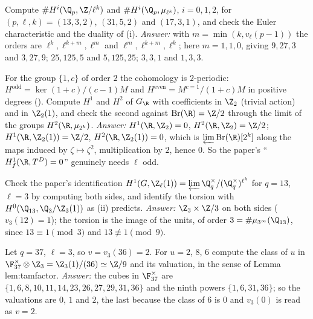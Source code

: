 \begin{exercise}\label{ex:galcoh:ex-orders}
Compute $\#H^i(\Q_p,\Z/\ell^k)$ and $\#H^i(\Q_p,\mu_{\ell^k})$, $i=0,1,2$, for $(p,\ell,k)=(13,3,2)$, $(31,5,2)$ and $(17,3,1)$, and check the Euler characteristic and the duality
of (i). \emph{Answer:} with $m=\min(k,v_\ell(p-1))$ the orders are $\ell^k,\ell^{k+m},\ell^m$ and $\ell^m,\ell^{k+m},\ell^k$; here $m=1,1,0$, giving
$9,27,3$ and $3,27,9$; $25,125,5$ and $5,125,25$; $3,3,1$ and $1,3,3$.
\end{exercise}

\begin{exercise}\label{ex:galcoh:ex-real-two}
For the group $\{1,c\}$ of order $2$ the cohomology is $2$-periodic: $H^{\mathrm{odd}}=\ker(1+c)/(c-1)M$ and $H^{\mathrm{even}}=M^{c=1}/(1+c)M$ in positive degrees (). Compute
$H^1$ and $H^2$ of $G_\R$ with coefficients in $\Z_2$ (trivial action) and in $\Z_2(1)$, and check the second against $\operatorname{Br}(\R)=\Z/2$ through the limit of the groups
$H^2(\R,\mu_{2^k})$. \emph{Answer:} $H^1(\R,\Z_2)=0$, $H^2(\R,\Z_2)=\Z/2$; $H^1(\R,\Z_2(1))=\Z/2$, $H^2(\R,\Z_2(1))=0$, which is $\varprojlim\operatorname{Br}(\R)[2^k]$ along the maps induced by
$\zeta\mapsto\zeta^2$, multiplication by $2$, hence $0$. So the paper's ``$H^1_f(\R,T^D)=0$'' genuinely needs $\ell$ odd.
\end{exercise}

\begin{exercise}\label{ex:galcoh:ex-q13}
Check the paper's identification $H^1(G,\Z_\ell(1))=\varprojlim\Q_q^\times/(\Q_q^\times)^{\ell^k}$ for $q=13$, $\ell=3$ by computing both sides, and identify the torsion with
$H^0(\Q_{13},\Q_3/\Z_3(1))$ as (ii) predicts. \emph{Answer:} $\Z_3\times\Z/3$ on both sides ($v_3(12)=1$); the torsion is the image of the units, of order
$3=\#\mu_{3^\infty}(\Q_{13})$, since $13\equiv1\pmod3$ and $13\not\equiv1\pmod9$.
\end{exercise}

\begin{exercise}\label{ex:galcoh:ex-q37}
Let $q=37$, $\ell=3$, so $v=v_3(36)=2$. For $u=2$, $8$, $6$ compute the class of $u$ in $\F_{37}^\times\otimes\Z_3=\Z_3(1)/(36)\simeq\Z/9$ and its valuation, in the sense of
Lemma lem:tamfactor. \emph{Answer:} the cubes in $\F_{37}^\times$ are $\{1,6,8,10,11,14,23,26,27,29,31,36\}$ and the ninth powers $\{1,6,31,36\}$; so the valuations are $0$, $1$
and $2$, the last because the class of $6$ is $0$ and $v_3(0)$ is read as $v=2$.
\end{exercise}

